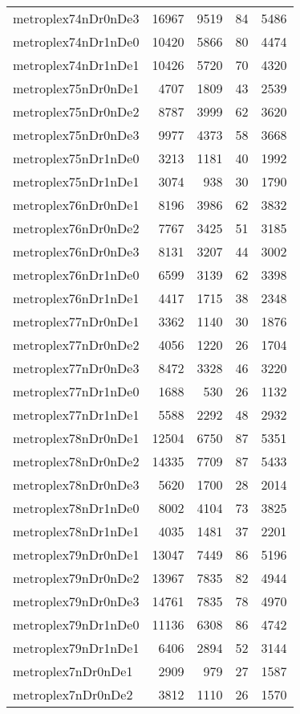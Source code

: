 \begin{longtable}{lrrrr}
metroplex74nDr0nDe3 & 16967 & 9519 & 84 & 5486 \\
metroplex74nDr1nDe0 & 10420 & 5866 & 80 & 4474 \\
metroplex74nDr1nDe1 & 10426 & 5720 & 70 & 4320 \\
metroplex75nDr0nDe1 & 4707 & 1809 & 43 & 2539 \\
metroplex75nDr0nDe2 & 8787 & 3999 & 62 & 3620 \\
metroplex75nDr0nDe3 & 9977 & 4373 & 58 & 3668 \\
metroplex75nDr1nDe0 & 3213 & 1181 & 40 & 1992 \\
metroplex75nDr1nDe1 & 3074 & 938 & 30 & 1790 \\
metroplex76nDr0nDe1 & 8196 & 3986 & 62 & 3832 \\
metroplex76nDr0nDe2 & 7767 & 3425 & 51 & 3185 \\
metroplex76nDr0nDe3 & 8131 & 3207 & 44 & 3002 \\
metroplex76nDr1nDe0 & 6599 & 3139 & 62 & 3398 \\
metroplex76nDr1nDe1 & 4417 & 1715 & 38 & 2348 \\
metroplex77nDr0nDe1 & 3362 & 1140 & 30 & 1876 \\
metroplex77nDr0nDe2 & 4056 & 1220 & 26 & 1704 \\
metroplex77nDr0nDe3 & 8472 & 3328 & 46 & 3220 \\
metroplex77nDr1nDe0 & 1688 & 530 & 26 & 1132 \\
metroplex77nDr1nDe1 & 5588 & 2292 & 48 & 2932 \\
metroplex78nDr0nDe1 & 12504 & 6750 & 87 & 5351 \\
metroplex78nDr0nDe2 & 14335 & 7709 & 87 & 5433 \\
metroplex78nDr0nDe3 & 5620 & 1700 & 28 & 2014 \\
metroplex78nDr1nDe0 & 8002 & 4104 & 73 & 3825 \\
metroplex78nDr1nDe1 & 4035 & 1481 & 37 & 2201 \\
metroplex79nDr0nDe1 & 13047 & 7449 & 86 & 5196 \\
metroplex79nDr0nDe2 & 13967 & 7835 & 82 & 4944 \\
metroplex79nDr0nDe3 & 14761 & 7835 & 78 & 4970 \\
metroplex79nDr1nDe0 & 11136 & 6308 & 86 & 4742 \\
metroplex79nDr1nDe1 & 6406 & 2894 & 52 & 3144 \\
metroplex7nDr0nDe1 & 2909 & 979 & 27 & 1587 \\
metroplex7nDr0nDe2 & 3812 & 1110 & 26 & 1570 \\

\end{longtable}
